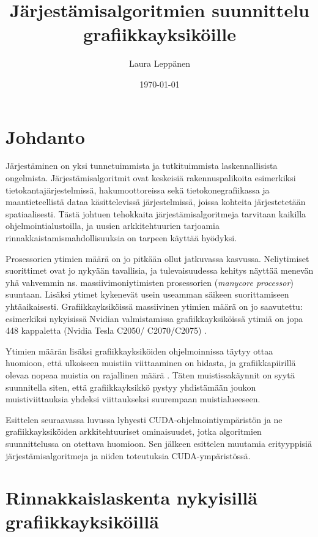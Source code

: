 \documentclass[a4paper,11pt]{article}
\newcommand{\engl}[1]{\foreignlanguage{english}{\em #1}}
\begin{document}
\title{Järjestämisalgoritmien suunnittelu grafiikkayksiköille}
\author{Laura Leppänen}
\date{\today}
\maketitle

\tableofcontents
\onehalfspacing

\newpage

\section{Johdanto}

Järjestäminen on yksi tunnetuimmista ja tutkituimmista laskennallisista ongelmista. Järjestämisalgoritmit ovat keskeisiä rakennuspalikoita esimerkiksi tietokantajärjestelmissä, hakumoottoreissa sekä tietokonegrafiikassa ja maantieteellistä dataa käsittelevissä järjestelmissä, joissa kohteita järjestetetään spatiaalisesti. Tästä johtuen tehokkaita järjestämisalgoritmeja tarvitaan kaikilla ohjelmointialustoilla, ja uusien arkkitehtuurien tarjoamia rinnakkaistamismahdollisuuksia on tarpeen käyttää hyödyksi.

Prosessorien ytimien määrä on jo pitkään ollut jatkuvassa kasvussa. Neliytimiset suorittimet ovat jo nykyään tavallisia, ja tulevaisuudessa kehitys näyttää menevän yhä vahvemmin ns. massiivimoniytimisten prosessorien (\engl{manycore processor}) suuntaan. Lisäksi ytimet kykenevät usein useamman säikeen suorittamiseen yhtäaikaisesti. Grafiikkayksiköissä massiivinen ytimien määrä on jo saavutettu: esimerkiksi nykyisissä Nvidian valmistamissa grafiikkayksiköissä ytimiä on jopa 448 kappaletta (Nvidia Tesla C2050/ C2070/C2075) \cite{nvidiafermi2010}.

Ytimien määrän lisäksi grafiikkayksiköiden ohjelmoinnissa täytyy ottaa huomioon, että ulkoiseen muistiin viittaaminen on hidasta, ja grafiikkapiirillä olevaa nopeaa muistia on rajallinen määrä \cite{leischner2010}. Täten muistissakäynnit on syytä suunnitella siten, että grafiikkayksikkö pystyy yhdistämään joukon muistiviittauksia yhdeksi viittaukseksi suurempaan muistialueeseen.

Esittelen seuraavassa luvussa lyhyesti CUDA-ohjelmointiympäristön ja ne grafiikkayksiköiden arkkitehtuuriset ominaisuudet, jotka algoritmien suunnittelussa on otettava huomioon. Sen jälkeen esittelen muutamia erityyppisiä järjestämisalgoritmeja ja niiden toteutuksia CUDA-ympäristössä.

\section{Rinnakkaislaskenta nykyisillä grafiikkayksiköillä}
\end{document}
